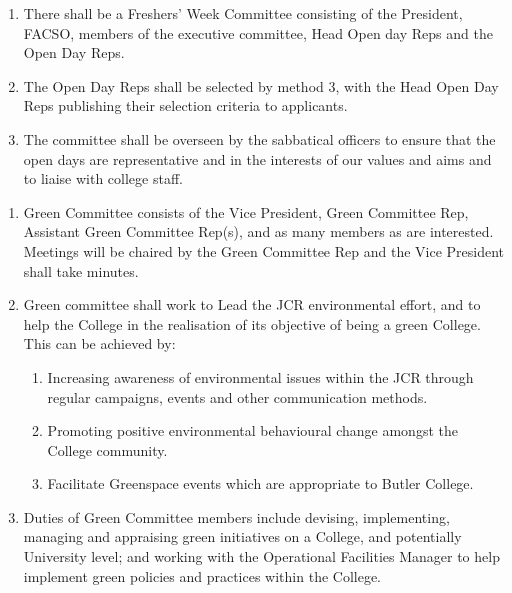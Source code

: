 
\begin{enumerate}
    \item There shall be a Freshers’ Week Committee consisting of the President, FACSO, members of the executive committee, Head Open day Reps and the Open Day Reps.
    \item The Open Day Reps shall be selected by method 3, with the Head Open Day Reps publishing their selection criteria to applicants.
    \item The committee shall be overseen by the sabbatical officers to ensure that the open days are representative and in the interests of our values and aims and to liaise with college staff.
\end{enumerate}


\begin{enumerate}
    \item Green Committee consists of the Vice President, Green Committee Rep, Assistant Green Committee Rep(s), and as many members as are interested. Meetings will be chaired by the Green Committee Rep and the Vice President shall take minutes.
    \item Green committee shall work to Lead the JCR environmental effort, and to help the College in the realisation of its objective of being a green College. This can be achieved by:
    \begin{enumerate}
        \item Increasing awareness of environmental issues within the JCR through regular campaigns, events and other communication methods.
        \item Promoting positive environmental behavioural change amongst the College community.
        \item Facilitate Greenspace events which are appropriate to Butler College.
    \end{enumerate}
    \item Duties of Green Committee members include devising, implementing, managing and appraising green initiatives on a College, and potentially University level; and working with the Operational Facilities Manager to help implement green policies and practices within the College.

\end{enumerate}

